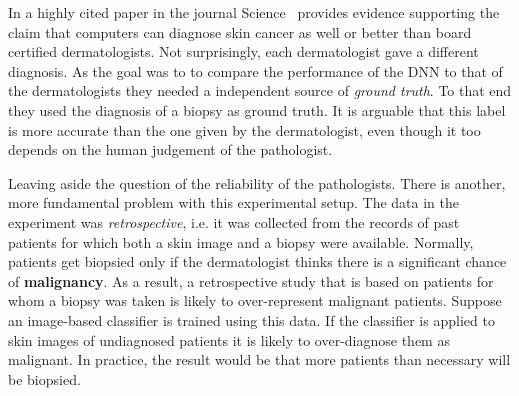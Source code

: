 \documentclass[11pt]{pnas-new}
\begin{document}
In a highly cited paper in the journal
Science~\cite{esteva2017dermatologist} provides evidence supporting
the claim that computers can diagnose skin cancer as well or better than board
certified dermatologists.
Not surprisingly, each dermatologist gave a different diagnosis.  As
the goal was to to compare the performance of the DNN to that of the
dermatologists they needed a independent source of {\em ground truth}.
To that end they used the diagnosis of a biopsy as ground truth. It is
arguable that this label is more accurate than the one given by the
dermatologist, even though it too depends on the human judgement of the
pathologist.

Leaving aside the question of the reliability of the
pathologists. There is another, more fundamental problem with this
experimental setup. The data in the experiment was {\em
  retrospective}, i.e. it was collected from the records of past
patients for which both a skin image and a biopsy were
available. Normally, patients get biopsied only if the dermatologist
thinks there is a significant chance of {\bf malignancy}. As a result,
a retrospective study that is based on patients for whom a biopsy was
taken is likely to over-represent malignant patients. Suppose an
image-based classifier is trained using this data. If the classifier
is applied to skin images of undiagnosed patients it is likely to
over-diagnose them as malignant. In practice, the result would be that
more patients than necessary will be biopsied.
\end{document}
